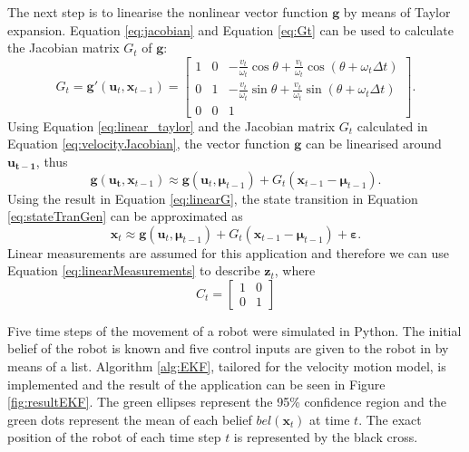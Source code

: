 \documentclass[12pt,oneside,openany,a4paper, %
afrikaans,english,
]{memoir}
\numberwithin{equation}{chapter}
\begin{document}
{The next step is to linearise the nonlinear vector function $\bm{g}$ by means of Taylor expansion. Equation \ref{eq:jacobian} and Equation \ref{eq:Gt} can be used to calculate the Jacobian matrix $G_t$ of $\bm{g}$:
\begin{equation}\label{eq:velocityJacobian}
G_t = \bm{g}'(\bm{u}_t, \bm{x}_{t-1}) =
\begin{bmatrix}
1 & 0 & -\frac{v_t}{\omega_t} \cos\theta + \frac{v_t}{\omega_t} \cos(\theta + \omega_t \Delta t)\\
0 & 1 & -\frac{v_t}{\omega_t}\sin\theta + \frac{v_t}{\omega_t}\sin(\theta + \omega_t \Delta t)\\
0 & 0 & 1 
\end{bmatrix}.
\end{equation}
Using Equation \ref{eq:linear_taylor} and the Jacobian matrix $G_t$ calculated in Equation \ref{eq:velocityJacobian}, the vector function $\bm{g}$ can be linearised around $\bm{u_{t-1}}$, thus
\begin{equation}\label{eq:linearG}
\bm{g}(\bm{u_t}, \bm{x}_{t-1}) \approx \bm{g}(\bm{u}_t, \bm{\mu}_{t-1}) + G_t(\bm{x}_{t-1} - 
\bm{\mu}_{t-1}).
\end{equation} 
Using the result in Equation \ref{eq:linearG}, the state transition in Equation \ref{eq:stateTranGen} can be approximated as
\begin{equation}
\bm{x}_t \approx \bm{g}(\bm{u}_t, \bm{\mu}_{t-1}) + G_t(\bm{x}_{t-1} - \bm{\mu}_{t-1}) + \bm{\varepsilon}.
\end{equation} 
Linear measurements are assumed for this application and therefore we can use Equation \ref{eq:linearMeasurements} to describe $\bm{z}_t$,
where
\begin{equation}
C_t = 
\begin{bmatrix}
1 & 0\\
0 & 1
\end{bmatrix}
\end{equation}

Five time steps of the movement of a robot were simulated in Python. The initial belief of the robot is known and five control inputs are given to the robot in by means of a list. Algorithm \ref{alg:EKF}, tailored for the velocity motion model, is implemented and the result of the application can be seen in Figure \ref{fig:resultEKF}. The green ellipses represent the 95\% confidence region and the green dots represent the mean of each belief $bel(\bm{x}_t)$ at time $t$. The exact position of the robot of each time step $t$ is represented by the black cross.

}
\end{document}
